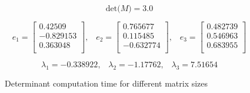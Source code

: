 \documentclass{article}
\begin{document}
\begin{equation}
 \label{eq:mat}
 \text{det(}M\text{)} = 3.0
\end{equation}

\begin{equation}
 \label{eq:mat}
e_{1} = \begin{bmatrix}
     0.42509 \\[0.3em]
     -0.829153 \\[0.3em]
     0.363048 \\[0.3em]
       \end{bmatrix}\text{,}\quad
e_{2} = \begin{bmatrix}
     0.765677 \\[0.3em]
     0.115485 \\[0.3em]
     -0.632774 \\[0.3em]
       \end{bmatrix}\text{,}\quad
e_{3} = \begin{bmatrix}
     0.482739 \\[0.3em]
     0.546963 \\[0.3em]
     0.683955 \\[0.3em]
       \end{bmatrix}
\end{equation}

\begin{equation}
 \label{eq:mat}
\lambda_{1} = -0.338922 \text{,}\quad
\lambda_{2} = -1.17762 \text{,}\quad
\lambda_{3} = 7.51654
\end{equation}

\begin{figure}[H]
  \begin{center}
  \end{center}
  \caption{Determinant computation time for different matrix sizes}
  \label{fig:mag_susc}
\end{figure}
\end{document}
